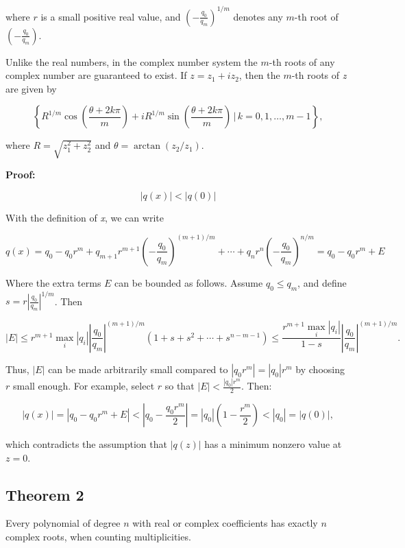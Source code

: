 where \(r\) is a small positive real value, and \({\left(-\frac{q_0}{q_m}\right)}^{1/m}\) denotes any 
\(m\)-th root of \(\left(-\frac{q_0}{q_m}\right)\).
\vspace{\baselineskip}

Unlike the real numbers, in the complex number system the \(m\)-th roots of any complex number are 
guaranteed to exist. If \(z = z_1 + i z_2\), then the \(m\)-th roots of \emph{z} are given by

\[
	\left\{ R^{1/m} \cos\left(\frac{\theta + 2k\pi}{m}\right) + i R^{1/m} \sin\left(\frac{\theta + 
	2k\pi}{m}\right) \,\bigg|\, k = 0, 1, \ldots, m-1 \right\},
\]

where \(R = \sqrt{z_1^2 + z_2^2}\) and \(\theta = \arctan(z_2 / z_1)\).
\vspace{\baselineskip}

\textbf{Proof:} 

\[|q(x)| < |q(0)|\]

With the definition of \emph{x}, we can write

\[
	q(x) = q_0 - q_0 r^m + q_{m+1} r^{m+1} {\left(-\frac{q_0}{q_m}\right)}^{(m+1)/m} + \cdots + q_n r^n 
	{\left(-\frac{q_0}{q_m}\right)}^{n/m} = q_0 - q_0 r^m + E
\]

Where the extra terms \(E\) can be bounded as follows. Assume \(q_0 \leq q_m\), and define 
\(s = r \left|\frac{q_0}{q_m}\right|^{1/m}\). Then

\[
	|E| \leq r^{m+1} \max_i |q_i| \left|\frac{q_0}{q_m}\right|^{(m+1)/m} (1 + s + s^2 + 
	\cdots + s^{n - m - 1}) \leq \frac{r^{m+1} \max_i |q_i|}{1 - s} \left|\frac{q_0}{q_m}\right|^{(m+1)/m}.
\]

Thus, \(|E|\) can be made arbitrarily small compared to \(|q_0 r^m| = |q_0| r^m\) by choosing \(r\) 
small enough. For example, select \(r\) so that \(|E| < \frac{|q_0| r^m}{2}\). Then:

\[
	|q(x)| = |q_0 - q_0 r^m + E| < |q_0 - \frac{q_0 r^m}{2}| = |q_0| \left(1 - \frac{r^m}{2}\right) < 
	|q_0| = |q(0)|,
\]

which contradicts the assumption that \(|q(z)|\) has a minimum nonzero value at \(z = 0\).
\QED

\subsection{Theorem 2}

Every polynomial of degree \(n\) with real or complex coefficients has exactly \(n\) complex roots, 
when counting multiplicities.
\vspace{\baselineskip}

